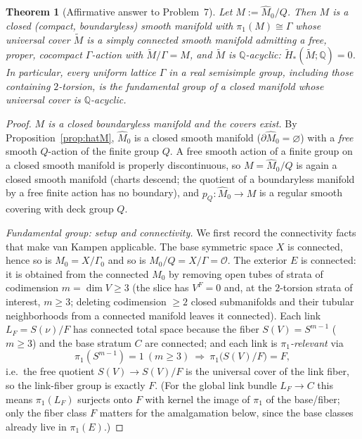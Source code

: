 \documentclass[12pt]{article}
\newtheorem{theorem}{Theorem}
\theoremstyle{definition}
\begin{document}
\begin{theorem}[Affirmative answer to Problem~7]\label{thm:main}
Let $M:=\widehat M_0/Q$. Then $M$ is a closed (compact, boundaryless) smooth
manifold with $\pi_1(M)\cong\Gamma$ whose universal cover $\widetilde M$ is a
\emph{simply connected} smooth manifold admitting a free, proper, cocompact
$\Gamma$-action with $\widetilde M/\Gamma=M$, and $\widetilde M$ is
$\mathbb{Q}$-acyclic: $\widetilde H_*(\widetilde M;\mathbb{Q})=0$. In particular,
every uniform lattice $\Gamma$ in a real semisimple group, including those
containing $2$-torsion, \emph{is} the fundamental group of a closed manifold
whose universal cover is $\mathbb{Q}$-acyclic.
\end{theorem}
\begin{proof}
\emph{$M$ is a closed boundaryless manifold and the covers exist.} By
Proposition~\ref{prop:hatM}, $\widehat M_0$ is a closed smooth manifold
($\partial\widehat M_0=\varnothing$) with a \emph{free} smooth $Q$-action of the
finite group $Q$. A free smooth action of a finite group on a closed smooth
manifold is properly discontinuous, so $M=\widehat M_0/Q$ is again a closed
smooth manifold (charts descend; the quotient of a boundaryless manifold by a
free finite action has no boundary), and $p_Q\colon\widehat M_0\to M$ is a
regular smooth covering with deck group $Q$.

\emph{Fundamental group: setup and connectivity.} We first record the connectivity
facts that make van Kampen applicable. The base symmetric space $X$ is connected,
hence so is $M_0=X/\Gamma_0$ and so is $M_0/Q=X/\Gamma=\mathcal O$. The exterior
$E$ is connected: it is obtained from the connected $M_0$ by removing open tubes
of strata of codimension $m=\dim V\ge 3$ (the slice has $V^F=0$ and, at the
$2$-torsion strata of interest, $m\ge3$; deleting codimension $\ge 2$ closed
submanifolds and their tubular neighborhoods from a connected manifold leaves it
connected). Each link $L_F=S(\nu)/F$ has connected total space because the fiber
$S(V)=S^{m-1}$ ($m\ge3$) and the base stratum $C$ are connected; and each link is
\emph{$\pi_1$-relevant} via
\begin{equation}\label{eq:linkgroup}
   \pi_1(S^{m-1})=1\ (m\ge3)\ \Longrightarrow\ \pi_1\big(S(V)/F\big)=F,
\end{equation}
i.e.\ the free quotient $S(V)\to S(V)/F$ is the universal cover of the link fiber,
so the link-fiber group is exactly $F$. (For the global link bundle $L_F\to C$
this means $\pi_1(L_F)$ surjects onto $F$ with kernel the image of $\pi_1$ of the
base/fiber; only the fiber class $F$ matters for the amalgamation below, since the
base classes already live in $\pi_1(E)$.)


\end{proof}
\end{document}
